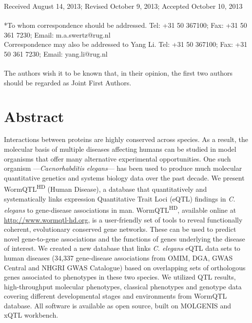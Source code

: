\noindent
Received August 14, 2013; Revised October 9, 2013; Accepted October 10, 2013
\\~\\
*To whom correspondence should be addressed. Tel: +31 50 367100; Fax: +31 50 361 7230; Email: m.a.swertz@rug.nl\\
Correspondence may also be addressed to Yang Li. Tel: +31 50 367100; Fax: +31 50 361 7230; Email: yang.li@rug.nl
\\~\\
The authors wish it to be known that, in their opinion, the first two authors should be regarded as Joint First Authors.

\section*{Abstract}
Interactions between proteins are highly conserved across species.
As a result, the molecular basis of multiple diseases affecting humans can be studied in model organisms that offer many alternative experimental opportunities.
One such organism ---\textsl{Caenorhabditis elegans}--- has been used to produce much molecular quantitative genetics and systems biology data over the past decade.
We present WormQTL\textsuperscript{HD} (Human Disease), a database that quantitatively and systematically links expression Quantitative Trait Loci (eQTL) findings in \textsl{C. elegans} to gene-disease associations in man.
WormQTL\textsuperscript{HD}, available online at \url{http://www.wormqtl-hd.org}, is a user-friendly set of tools to reveal functionally coherent, evolutionary conserved gene networks.
These can be used to predict novel gene-to-gene associations and the functions of genes underlying the disease of interest.
We created a new database that links \textsl{C. elegans} eQTL data sets to human diseases (34,337 gene-disease associations from OMIM, DGA, GWAS Central and NHGRI GWAS Catalogue) based on overlapping sets of orthologous genes associated to phenotypes in these two species.
We utilized QTL results, high-throughput molecular phenotypes, classical phenotypes and genotype data covering different developmental stages and environments from WormQTL database.
All software is available as open source, built on MOLGENIS and xQTL workbench.

